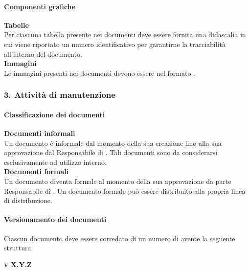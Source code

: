 \paragraph*{Componenti grafiche}
\textbf{Tabelle}  \\
Per ciascuna tabella presente nei documenti deve essere fornita una didascalia in cui viene riportato un numero identificativo per garantirne la tracciabilità all'interno del documento. \\

\textbf{Immagini} \\
Le immagini presenti nei documenti devono essere nel formato . \\


\subsubsection{3. Attivit\`a di manutenzione}   %
\paragraph*{Classificazione dei documenti}
\textbf{Documenti informali} \\
Un documento è informale dal momento della sua creazione fino alla sua approvazione dal Responsabile di . Tali documenti sono da considerarsi esclusivamente ad utilizzo interno. \\
\textbf{Documenti formali}  \\
Un documento diventa formale al momento della sua approvazione da parte Responsabile di . Un documento formale pu\`o essere distribuito alla propria linea di distribuzione.

\paragraph*{Versionamento dei documenti}
Ciascun documento deve essere corredato di un numero di  avente la seguente struttura:

\begin{center}
  \textbf{v X.Y.Z}
\end{center}

